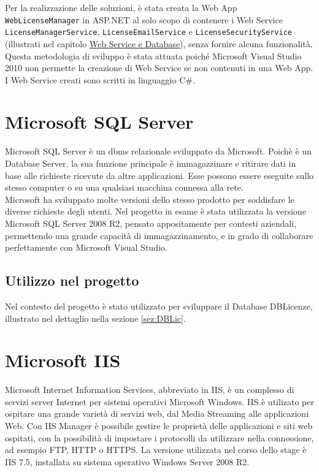 Per la realizzazione delle soluzioni, è stata creata la Web App \texttt{WebLicenseManager} in ASP.NET al solo scopo di contenere i Web Service \texttt{LicenseManagerService}, \texttt{LicenseEmailService} e \texttt{LicenseSecurityService} (illustrati nel capitolo {\hyperref[cap:sviluppo-software]{Web Service e Database}}), senza fornire alcuna funzionalità. Questa metodologia di sviluppo è stata attuata poiché Microsoft Visual Studio 2010 non permette la creazione di Web Service se non contenuti in una Web App.\\
I Web Service creati sono scritti in linguaggio C\#.

\section{Microsoft SQL Server}

Microsoft SQL Server è un \gls{dbms} relazionale sviluppato da Microsoft. Poichè è un Database Server, la sua funzione principale è immagazzinare e ritirare dati in base alle richieste ricevute da altre applicazioni. Esse possono essere eseguite sullo stesso computer o su una qualsiasi macchina connessa alla rete.
\\
Microsoft ha sviluppato molte versioni dello stesso prodotto per soddisfare le diverse richieste degli utenti. Nel progetto in esame è stata utilizzata la versione Microsoft SQL Server 2008 R2, pensato appositamente per contesti aziendali, permettendo una grande capacità di immagazzinamento, e in grado di collaborare perfettamente con Microsoft Visual Studio.

\subsection{Utilizzo nel progetto}

Nel contesto del progetto è stato utilizzato per sviluppare il Database DBLicenze, illustrato nel dettaglio nella sezione \ref{sez:DBLic}.

\section{Microsoft IIS}

Microsoft Internet Information Services, abbreviato in IIS, è un complesso di servizi server Internet per sistemi operativi Microsoft Windows.
IIS è utilizato per ospitare una grande varietà di servizi web, dal Media Streaming alle applicazioni Web. Con IIS Manager è possibile gestire le proprietà delle applicazioni e siti web ospitati, con la possibilità di impostare i protocolli da utilizzare nella connessione, ad esempio FTP, \gls{HTTP} o \gls{HTTPS}. 
La versione utilizzata nel corso dello stage è IIS 7.5, installata su sistema operativo Windows Server 2008 R2.


